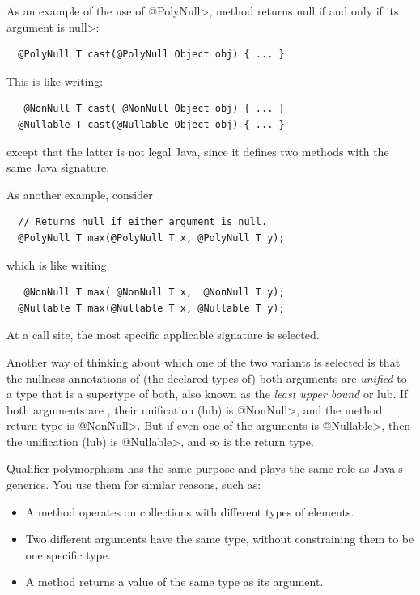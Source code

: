 As an example of the use of \<@PolyNull>, method
returns null if and only if its argument is \<null>:

\begin{Verbatim}
  @PolyNull T cast(@PolyNull Object obj) { ... }
\end{Verbatim}

\noindent
This is like writing:

\begin{Verbatim}
   @NonNull T cast( @NonNull Object obj) { ... }
  @Nullable T cast(@Nullable Object obj) { ... }
\end{Verbatim}

\noindent
except that the latter is not legal Java, since it defines two
methods with the same Java signature.


As another example, consider

\begin{Verbatim}
  // Returns null if either argument is null.
  @PolyNull T max(@PolyNull T x, @PolyNull T y);
\end{Verbatim}

\noindent
which is like writing

\begin{Verbatim}
   @NonNull T max( @NonNull T x,  @NonNull T y);
  @Nullable T max(@Nullable T x, @Nullable T y);
\end{Verbatim}

\noindent
At a call site, the most specific applicable signature is selected.

Another way of thinking about which one of the two  variants is
selected is that the nullness annotations of (the declared types of) both
arguments are \emph{unified} to a type that is a supertype of both, also
known as the \emph{least upper bound} or lub.  If both
arguments are , their unification (lub) is \<@NonNull>, and the
method return type is \<@NonNull>.  But if even one of the arguments is \<@Nullable>,
then the unification (lub) is \<@Nullable>, and so is the return type.




Qualifier polymorphism has the same purpose and plays the same role as
Java's generics.  You use them for similar reasons, such as:
\begin{itemize}
\item
  A method operates on collections with different types of
  elements.
\item
  Two different arguments have the same type, without constraining them to
  be one specific type.
\item
  A method returns a value of the same type as its argument.
\end{itemize}


